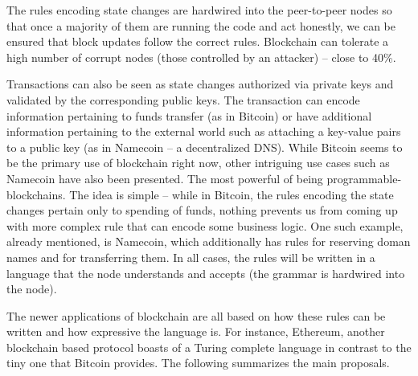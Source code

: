\documentclass[]{report}   %
\begin{document}
The rules encoding state changes are hardwired into the peer-to-peer nodes so that once a majority of them are running the code and act honestly, we can be ensured that block updates follow the correct rules. Blockchain can tolerate a high number of corrupt nodes (those controlled by an attacker) -- close to 40\%. 

Transactions can also be seen as state changes authorized via private keys and validated by the corresponding public keys. The transaction can encode information pertaining to funds transfer (as in Bitcoin) or have additional information pertaining to the external world such as attaching a key-value pairs to a public key (as in Namecoin -- a decentralized DNS).
While Bitcoin seems to be the primary use of blockchain right now, other intriguing use cases such as Namecoin have also been presented. The most powerful of being programmable-blockchains. The idea is simple -- while in Bitcoin, the rules encoding the state changes pertain only to spending of funds, nothing prevents us from coming up with more complex rule that can encode some business logic. One such example, already mentioned, is Namecoin, which additionally has rules for reserving doman names and for transferring them. In all cases, the rules will be written in a language that the node understands and accepts (the grammar is hardwired into the node). 

The newer applications of blockchain are all based on how these rules can be written and how expressive the language is. For instance, Ethereum, another blockchain based protocol boasts of a Turing complete language in contrast to the tiny one that Bitcoin provides. The following summarizes the main proposals.
\end{document}
